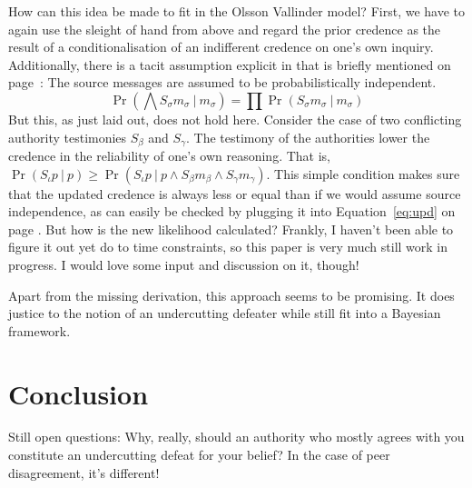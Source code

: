 \documentclass[11pt, a4paper]{scrartcl}
\newcommand{\given}[1][]{\:#1\vert\:}
\begin{document}
How can this idea be made to fit in the Olsson Vallinder model? First, we have to again use the sleight of hand from above and regard the prior credence as the result of a conditionalisation of an indifferent credence on one's own inquiry. Additionally, there is a tacit assumption explicit in \textcite{Angere2010} that is briefly mentioned on page~\pageref{eq:upd}: The source messages are assumed to be probabilistically independent. 
\[\Pr \left( \bigwedge S_{\sigma}m_\sigma \given m_\sigma\right) = \prod \Pr\left( S_{\sigma}m_\sigma \given m_\sigma\right)\] 
But this, as just laid out, does not hold here. Consider the case of two conflicting authority testimonies $S_\beta$ and $S_\gamma$. The testimony of the authorities lower the credence in the reliability of one's own reasoning. That is, $\Pr(S_\iota p \given p) \geqslant \Pr(S_\iota p \given p \land S_\beta m_\beta \land S_\gamma m_\gamma)$. This simple condition makes sure that the updated credence is always less or equal than if we would assume source independence, as can easily be checked by plugging it into Equation~\ref{eq:upd} on page \pageref{eq:upd}. But how is the new likelihood calculated? Frankly, I haven't been able to figure it out yet do to time constraints, so this paper is very much still work in progress. I would love some input and discussion on it, though!

Apart from the missing derivation, this approach seems to be promising. It does justice to the notion of an undercutting defeater while still fit into a Bayesian framework. 

\section{Conclusion}

Still open questions: Why, really, should an authority who mostly agrees with you constitute an undercutting defeat for your belief? In the case of peer disagreement, it's different!  
\printbibliography{}
\end{document}
